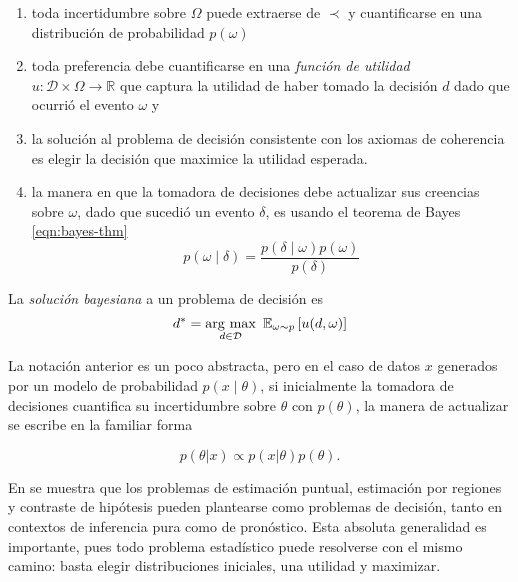 \documentclass[main.tex]{subfiles}
\begin{document}
\begin{enumerate}[label=\roman*]
	\item toda incertidumbre sobre $\Omega$ puede extraerse de $\prec$ y
	cuantificarse en una distribución de probabilidad $p(\omega)$
	\item toda preferencia debe cuantificarse en una \textit{función de
	utilidad} \\  $u: \mathcal{D}\times\Omega \to \mathbb{R}$  que captura la
	utilidad de haber tomado la decisión $d$ dado que ocurrió el evento
	$\omega$ y
	\item la solución al problema de decisión consistente con los axiomas de
	coherencia es elegir la decisión que maximice la utilidad esperada.
	\item la manera en que la tomadora de decisiones debe actualizar sus creencias sobre $\omega$, dado que sucedió un evento $\delta$, es usando el teorema de Bayes \eqref{eqn:bayes-thm}
		\begin{equation*}
		p(\omega\mid\delta) = \frac{p(\delta\mid\omega)p(\omega)}{p(\delta)}
		\end{equation*}
\end{enumerate}

\begin{definition}
	La \textit{solución bayesiana} a un problema de decisión es 
	\begin{equation}
	d^* = \argmax_{d \in\mathcal{D}} \ 
	\mathbb{E}_{\omega\sim p}\left[u(d, \omega)\right]
	\end{equation}
\end{definition}

La notación anterior es un poco abstracta, pero en el caso de datos $x$
generados por un modelo de probabilidad $p(x\mid\theta)$, si inicialmente la
tomadora de decisiones cuantifica su incertidumbre sobre $\theta$ con
$p(\theta)$, la manera de actualizar se escribe en la familiar forma

\begin{equation*}
	p(\theta | x ) 	\propto p(x|\theta)p(\theta).
\end{equation*}

En \cite{bernardo} se muestra que los problemas de estimación puntual,
estimación por regiones y contraste de hipótesis pueden plantearse como
problemas de decisión, tanto en contextos de inferencia pura como de pronóstico.
Esta absoluta generalidad es importante, pues todo problema estadístico puede
resolverse con el mismo camino: basta elegir distribuciones iniciales, una
utilidad y maximizar.
\end{document}
